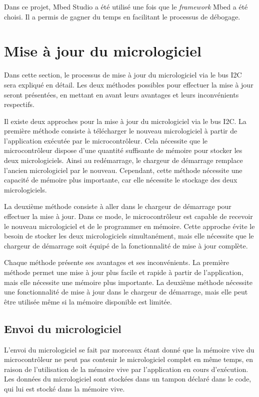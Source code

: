 Dans ce projet, Mbed Studio a été utilisé une fois que le \textit{\gls{framework}} Mbed a été choisi.
Il a permis de gagner du temps en facilitant le processus de débogage.

\section{Mise à jour du micrologiciel}

Dans cette section, le processus de mise à jour du micrologiciel via le bus I2C sera expliqué en détail.
Les deux méthodes possibles pour effectuer la mise à jour seront présentées, en mettant en avant leurs avantages et leurs inconvénients respectifs.

Il existe deux approches pour la mise à jour du micrologiciel via le bus I2C.
La première méthode consiste à télécharger le nouveau micrologiciel à partir de l'application exécutée par le microcontrôleur.
Cela nécessite que le microcontrôleur dispose d'une quantité suffisante de mémoire pour stocker les deux micrologiciels.
Ainsi au redémarrage, le chargeur de démarrage remplace l'ancien micrologiciel par le nouveau.
Cependant, cette méthode nécessite une capacité de mémoire plus importante, car elle nécessite le stockage des deux micrologiciels.

La deuxième méthode consiste à aller dans le chargeur de démarrage pour effectuer la mise à jour.
Dans ce mode, le microcontrôleur est capable de recevoir le nouveau micrologiciel et de le programmer en mémoire.
Cette approche évite le besoin de stocker les deux micrologiciels simultanément, mais elle nécessite que le chargeur de démarrage soit équipé de la fonctionnalité de mise à jour complète.

Chaque méthode présente ses avantages et ses inconvénients.
La première méthode permet une mise à jour plus facile et rapide à partir de l'application, mais elle nécessite une mémoire plus importante.
La deuxième méthode nécessite une fonctionnalité de mise à jour dans le chargeur de démarrage, mais elle peut être utilisée même si la mémoire disponible est limitée.

\subsection{Envoi du micrologiciel}

L'envoi du micrologiciel se fait par morceaux étant donné que la mémoire vive du microcontrôleur ne peut pas contenir le micrologiciel complet en même temps, en raison de l'utilisation de la mémoire vive par l'application en cours d'exécution.
Les données du micrologiciel sont stockées dans un tampon déclaré dans le code, qui lui est stocké dans la mémoire vive.

